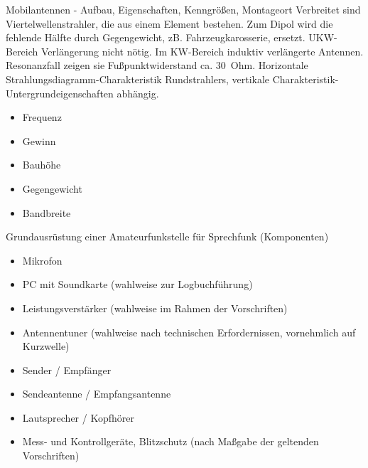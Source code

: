 \documentclass[avery5371,grid,frame,a4paper]{flashcards}
\newcommand{\card}[3]{
  \begin{flashcard}[{\chap} -- #1]{#2}#3\end{flashcard}
}
\begin{document}
\card{37}{Mobilantennen - Aufbau, Eigenschaften, Kenngrößen, Montageort}{
  \small
  Verbreitet sind Viertelwellenstrahler, die aus einem Element bestehen. Zum Dipol wird die fehlende Hälfte durch Gegengewicht, zB. Fahrzeugkarosserie, ersetzt. UKW-Bereich Verlängerung nicht nötig. Im KW-Bereich induktiv verlängerte Antennen. Resonanzfall zeigen sie Fußpunktwiderstand ca. 30~Ohm. Horizontale Strahlungsdiagramm-Charakteristik Rundstrahlers, vertikale Charakteristik-Untergrundeigenschaften abhängig.

  \begin{minipage}{0.45\textwidth}
    \begin{itemize}\itemsep0pt
      \item Frequenz
      \item Gewinn
      \item Bauhöhe
    \end{itemize}
  \end{minipage}
  \begin{minipage}{0.5\textwidth}
    \begin{itemize}\itemsep0pt
      \item Gegengewicht
      \item Bandbreite
    \end{itemize}
  \end{minipage}
}
\card{38}{Grundausrüstung einer Amateurfunkstelle für Sprechfunk (Komponenten)}{
  \footnotesize
  \begin{minipage}{0.49\textwidth}
    \begin{itemize}
      \item Mikrofon
      \item PC mit Soundkarte (wahlweise zur Logbuchführung)
      \item Leistungsverstärker (wahlweise im Rahmen der Vorschriften)
      \item Antennentuner (wahlweise nach technischen Erfordernissen, vornehmlich auf Kurzwelle)
    \end{itemize}
  \end{minipage}
  \begin{minipage}{0.5\textwidth}
    \begin{itemize}
      \item Sender / Empfänger
      \item Sendeantenne / Empfangsantenne
      \item Lautsprecher / Kopfhörer
      \item Mess- und Kontrollgeräte, Blitzschutz (nach Maßgabe der geltenden Vorschriften)
    \end{itemize}
  \end{minipage}
}
\end{document}
